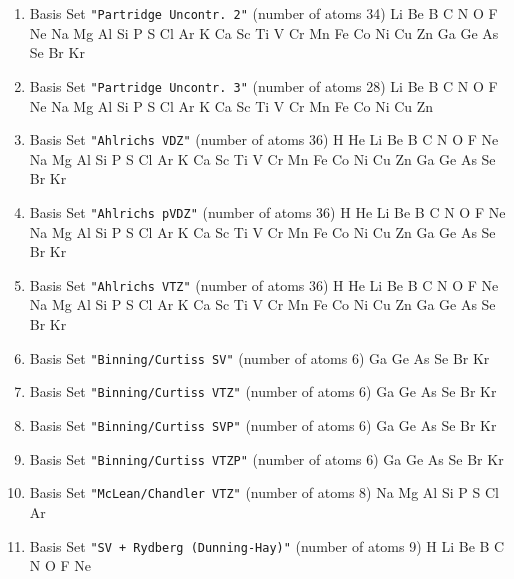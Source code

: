 \begin{enumerate}
\item Basis Set \verb#"Partridge Uncontr. 2"# (number of atoms 34)  \newline 
  Li Be B C N O F Ne Na Mg Al Si P S Cl Ar K Ca Sc Ti V Cr Mn Fe Co
 Ni Cu Zn Ga Ge As Se Br Kr


\item Basis Set \verb#"Partridge Uncontr. 3"# (number of atoms 28)  \newline 
  Li Be B C N O F Ne Na Mg Al Si P S Cl Ar K Ca Sc Ti V Cr Mn Fe Co
 Ni Cu Zn


\item Basis Set \verb#"Ahlrichs VDZ"# (number of atoms 36)  \newline 
  H He Li Be B C N O F Ne Na Mg Al Si P S Cl Ar K Ca Sc Ti V Cr Mn
 Fe Co Ni Cu Zn Ga Ge As Se Br Kr


\item Basis Set \verb#"Ahlrichs pVDZ"# (number of atoms 36)  \newline 
  H He Li Be B C N O F Ne Na Mg Al Si P S Cl Ar K Ca Sc Ti V Cr Mn
 Fe Co Ni Cu Zn Ga Ge As Se Br Kr


\item Basis Set \verb#"Ahlrichs VTZ"# (number of atoms 36)  \newline 
  H He Li Be B C N O F Ne Na Mg Al Si P S Cl Ar K Ca Sc Ti V Cr Mn
 Fe Co Ni Cu Zn Ga Ge As Se Br Kr


\item Basis Set \verb#"Binning/Curtiss SV"# (number of atoms 6)  \newline 
  Ga Ge As Se Br Kr


\item Basis Set \verb#"Binning/Curtiss VTZ"# (number of atoms 6)  \newline 
  Ga Ge As Se Br Kr


\item Basis Set \verb#"Binning/Curtiss SVP"# (number of atoms 6)  \newline 
  Ga Ge As Se Br Kr


\item Basis Set \verb#"Binning/Curtiss VTZP"# (number of atoms 6)  \newline 
  Ga Ge As Se Br Kr


\item Basis Set \verb#"McLean/Chandler VTZ"# (number of atoms 8)  \newline 
  Na Mg Al Si P S Cl Ar


\item Basis Set \verb#"SV + Rydberg (Dunning-Hay)"# (number of atoms 9)  \newline 
  H Li Be B C N O F Ne



\end{enumerate}
